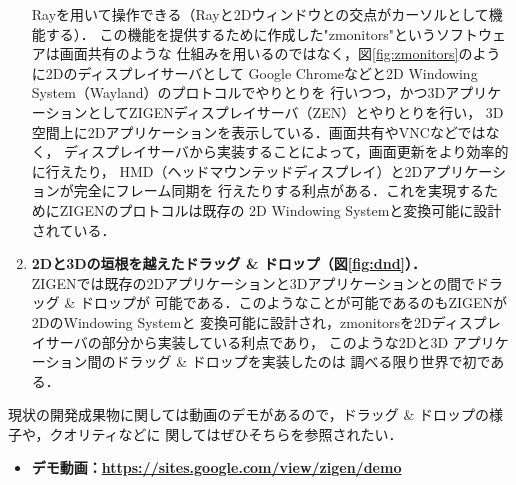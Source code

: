 \begin{enumerate}
        Rayを用いて操作できる（Rayと2Dウィンドウとの交点がカーソルとして機能する）．
        この機能を提供するために作成した"zmonitors"というソフトウェアは画面共有のような
        仕組みを用いるのではなく，図\ref{fig:zmonitors}のように2Dのディスプレイサーバとして
        Google Chromeなどと2D Windowing System（Wayland）のプロトコルでやりとりを
        行いつつ，かつ3DアプリケーションとしてZIGENディスプレイサーバ（ZEN）とやりとりを行い，
        3D空間上に2Dアプリケーションを表示している．画面共有やVNCなどではなく，
        ディスプレイサーバから実装することによって，画面更新をより効率的に行えたり，
        HMD（ヘッドマウンテッドディスプレイ）と2Dアプリケーションが完全にフレーム同期を
        行えたりする利点がある．これを実現するためにZIGENのプロトコルは既存の
        2D Windowing Systemと変換可能に設計されている．
  \item \textbf{2Dと3Dの垣根を越えたドラッグ \& ドロップ（図\ref{fig:dnd}）．}\\
        ZIGENでは既存の2Dアプリケーションと3Dアプリケーションとの間でドラッグ \& ドロップが
        可能である．このようなことが可能であるのもZIGENが2DのWindowing Systemと
        変換可能に設計され，zmonitorsを2Dディスプレイサーバの部分から実装している利点であり，
        このような2Dと3D アプリケーション間のドラッグ \& ドロップを実装したのは
        調べる限り世界で初である．
\end{enumerate}

現状の開発成果物に関しては動画のデモがあるので，ドラッグ \& ドロップの様子や，クオリティなどに
関してはぜひそちらを参照されたい．
\begin{itemize}
  \item \textbf{デモ動画：\url{https://sites.google.com/view/zigen/demo}}
\end{itemize}

